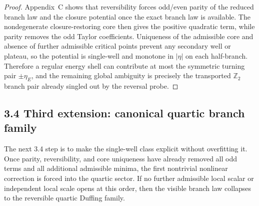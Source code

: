 \begin{proof}
Appendix~C shows that reversibility forces odd/even parity of the reduced branch law and the closure potential once the exact branch law is available. The nondegenerate closure-restoring core then gives the positive quadratic term, while parity removes the odd Taylor coefficients. Uniqueness of the admissible core and absence of further admissible critical points prevent any secondary well or plateau, so the potential is single-well and monotone in $|\eta|$ on each half-branch. Therefore a regular energy shell can contribute at most the symmetric turning pair $\pm\eta_E$, and the remaining global ambiguity is precisely the transported $\mathbb Z_2$ branch pair already singled out by the reversal probe.
\end{proof}

\subsection*{3.4 Third extension: canonical quartic branch family}
The next 3.4 step is to make the single-well class explicit without overfitting it. Once parity, reversibility, and core uniqueness have already removed all odd terms and all additional admissible minima, the first nontrivial nonlinear correction is forced into the quartic sector. If no further admissible local scalar or independent local scale opens at this order, then the visible branch law collapses to the reversible quartic Duffing family.


